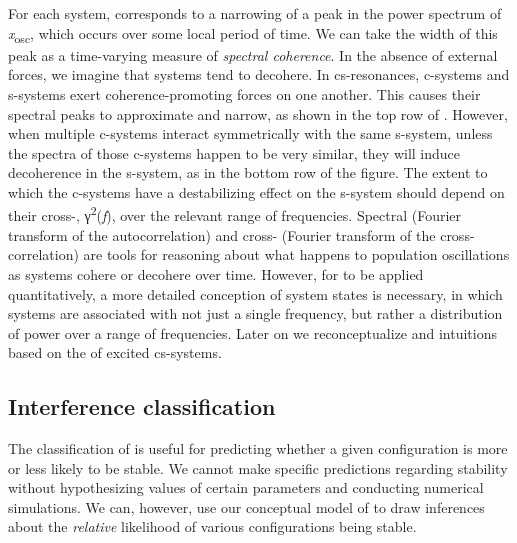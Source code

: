   For each system,  corresponds to a narrowing of a peak in the power spectrum of \textit{x}\textsubscript{osc}, which occurs over some local period of time. We can take the width of this peak as a time-varying measure of \textit{spectral coherence}. In the absence of external forces, we imagine that systems tend to decohere. In cs-resonances, c-systems and s-systems exert coherence-promoting forces on one another. This causes their spectral peaks to approximate and narrow, as shown in the top row of {}. However, when multiple c-systems interact symmetrically with the same s-system, unless the spectra of those c-systems happen to be very similar, they will induce decoherence in the s-system, as in the bottom row of the figure. The extent to which the c-systems have a destabilizing effect on the s-system should depend on their cross-, γ\textsuperscript{2}(\textit{f}), over the relevant range of frequencies. Spectral  (Fourier transform of the autocorrelation) and cross- (Fourier transform of the cross-correlation) are tools for reasoning about what happens to population oscillations as systems cohere or decohere over time. However, for  to be applied quantitatively, a more detailed  conception of system states is necessary, in which systems are associated with not just a single frequency, but rather a distribution of power over a range of frequencies. Later on we reconceptualize  and  intuitions based on the  of excited cs-systems.

\subsection{Interference classification}

The classification of  is useful for predicting whether a given configuration is more or less likely to be stable. We cannot make specific predictions regarding stability without hypothesizing values of certain parameters and conducting numerical simulations. We can, however, use our conceptual model of  to draw inferences about the \textit{relative} likelihood of various configurations being stable.

